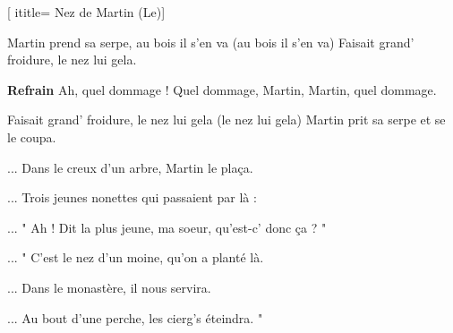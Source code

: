  [
ititle= {Nez de Martin (Le)}]

\beginverse
Martin prend sa serpe, au bois il s'en va (au bois il s'en va)
Faisait grand' froidure, le nez lui gela.
\endverse

\beginchorus
\textbf {Refrain}
Ah, quel dommage !
Quel dommage, Martin,
Martin, quel dommage.
\endchorus

\beginverse
Faisait grand' froidure, le nez lui gela (le nez lui gela)
Martin prit sa serpe et se le coupa.
\endverse

\beginverse
... Dans le creux d'un arbre, Martin le plaça.
\endverse

\beginverse
... Trois jeunes nonettes qui passaient par là :
\endverse

\beginverse
... " Ah ! Dit la plus jeune, ma soeur, qu'est-c' donc ça ? "
\endverse

\beginverse
... " C'est le nez d'un moine, qu'on a planté là.
\endverse

\beginverse
... Dans le monastère, il nous servira.
\endverse

\beginverse
... Au bout d'une perche, les cierg's éteindra. "
\endverse

\endsong

